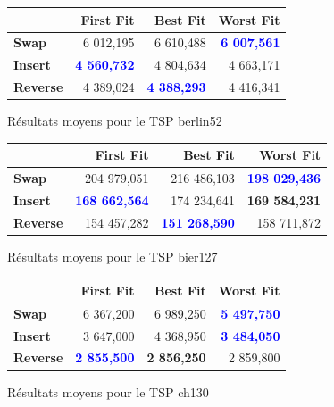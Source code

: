 \documentclass[a4paper,10pt]{report}
\begin{document}
\begin{figure}[h]
  \begin{center}
    \begin{tabular}{|l|r|r|r|}
      \hline
      &		\textbf{First Fit}&	\textbf{Best Fit}&	\textbf{Worst
Fit}\\\hline
      \textbf{Swap}&
	  6 012,195&
	  6 610,488&
	  \textbf{\textcolor{blue}{6 007,561}}\\\hline
      \textbf{Insert}&
	  \textbf{\textcolor{blue}{4 560,732}}&
	  4 804,634&
	  4 663,171\\\hline
      \textbf{Reverse}&
	  4 389,024&
	  \textbf{\textcolor{blue}{4 388,293}}&
	  4 416,341\\\hline
    \end{tabular}
    \caption{Résultats moyens pour le TSP berlin52}
  \end{center}
\end{figure}

\begin{figure}[h]
  \begin{center}
    \begin{tabular}{|l|r|r|r|}
      \hline
      &		\textbf{First Fit}&	\textbf{Best Fit}&	\textbf{Worst
Fit}\\\hline
      \textbf{Swap}&
	  204 979,051&
	  216 486,103&
	  \textbf{\textcolor{blue}{198 029,436}}\\\hline
      \textbf{Insert}&
	  \textbf{\textcolor{blue}{168 662,564}}&
	  174 234,641&
	  \textbf{169 584,231}\\\hline
      \textbf{Reverse}&
	  154 457,282&
	  \textbf{\textcolor{blue}{151 268,590}}&
	  158 711,872\\\hline
    \end{tabular}
    \caption{Résultats moyens pour le TSP bier127}
  \end{center}
\end{figure}

\begin{figure}[h]
  \begin{center}
    \begin{tabular}{|l|r|r|r|}
      \hline
      &		\textbf{First Fit}&	\textbf{Best Fit}&	\textbf{Worst
Fit}\\\hline
      \textbf{Swap}&
	  6 367,200&
	  6 989,250&
	  \textbf{\textcolor{blue}{5 497,750}}\\\hline
      \textbf{Insert}&
	  3 647,000&
	  4 368,950&
	  \textbf{\textcolor{blue}{3 484,050}}\\\hline
      \textbf{Reverse}&
	  \textbf{\textcolor{blue}{2 855,500}}&
	  \textbf{2 856,250}&
	  2 859,800\\\hline
    \end{tabular}
    \caption{Résultats moyens pour le TSP ch130}
  \end{center}
\end{figure}
\end{document}
